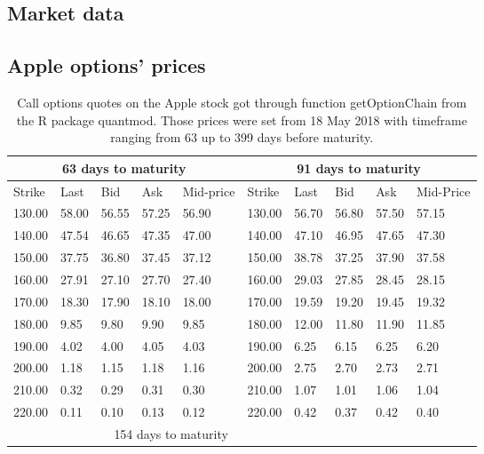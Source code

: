 \documentclass[a4paper, 12pt]{report}
\begin{document}
\begin{appendices}
\chapter{Market data}
\label{cha:appendix:market}


\section{Apple options' prices}
\label{sec:appendix:option}

\begin{longtable}{|lllll|lllll|}
\caption[Market option data (AAPL)]{Call options quotes on the Apple stock got through function getOptionChain from the R package quantmod. Those prices were set from 18 May 2018 with timeframe ranging from 63 up to 399 days before maturity.} 
\label{t:market:option}
\endfirsthead
  \hline 
  \multicolumn{5}{|c|}{63 days to maturity} & \multicolumn{5}{c|}{91 days to maturity} \\*
  \hline
  Strike & Last & Bid & Ask & Mid-price & Strike & Last & Bid & Ask & Mid-Price \\*
  \hline
  130.00 & 58.00 & 56.55 & 57.25 & 56.90 &   130.00 & 56.70 & 56.80 & 57.50 & 57.15 \\*
  140.00 & 47.54 & 46.65 & 47.35 & 47.00 &  140.00 & 47.10 & 46.95 & 47.65 & 47.30 \\*
  150.00 & 37.75 & 36.80 & 37.45 & 37.12 &  150.00 & 38.78 & 37.25 & 37.90 & 37.58 \\*
  160.00 & 27.91 & 27.10 & 27.70 & 27.40 &  160.00 & 29.03 & 27.85 & 28.45 & 28.15 \\*
  170.00 & 18.30 & 17.90 & 18.10 & 18.00 &  170.00 & 19.59 & 19.20 & 19.45 & 19.32 \\*
  180.00 & 9.85 & 9.80 & 9.90 & 9.85 &  180.00 & 12.00 & 11.80 & 11.90 & 11.85 \\*
  190.00 & 4.02 & 4.00 & 4.05 & 4.03 &  190.00 & 6.25 & 6.15 & 6.25 & 6.20 \\*
  200.00 & 1.18 & 1.15 & 1.18 & 1.16 &  200.00 & 2.75 & 2.70 & 2.73 & 2.71 \\*
  210.00 & 0.32 & 0.29 & 0.31 & 0.30 &  210.00 & 1.07 & 1.01 & 1.06 & 1.04 \\*
  220.00 & 0.11 & 0.10 & 0.13 & 0.12 &  220.00 & 0.42 & 0.37 & 0.42 & 0.40 \\*
  \hline \pagebreak \hline
  \multicolumn{5}{|c|}{126 days to maturity} & \multicolumn{5}{c|}{154 days to maturity} \\

\end{longtable}
\end{appendices}
\end{document}
